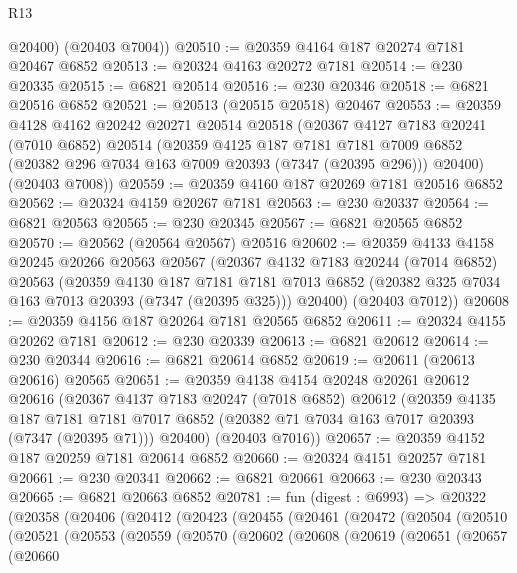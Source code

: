 \begin{lexlean}{R13}
\begin{coremodule}
        @20400)
      (@20403 @7004))
@20510 := @20359 @4164 @187 @20274 @7181 @20467 @6852
@20513 := @20324 @4163 @20272 @7181
@20514 := @230 @20335
@20515 := @6821 @20514
@20516 := @230 @20346
@20518 := @6821 @20516 @6852
@20521 := @20513 (@20515 @20518) @20467
@20553 := @20359
    @4128
    @4162
    @20242
    @20271
    @20514
    @20518
    (@20367
      @4127
      @7183
      @20241
      (@7010 @6852)
      @20514
      (@20359
        @4125
        @187
        @7181
        @7181
        @7009
        @6852
        (@20382 @296 @7034 @163 @7009 @20393 (@7347 (@20395 @296)))
        @20400)
      (@20403 @7008))
@20559 := @20359 @4160 @187 @20269 @7181 @20516 @6852
@20562 := @20324 @4159 @20267 @7181
@20563 := @230 @20337
@20564 := @6821 @20563
@20565 := @230 @20345
@20567 := @6821 @20565 @6852
@20570 := @20562 (@20564 @20567) @20516
@20602 := @20359
    @4133
    @4158
    @20245
    @20266
    @20563
    @20567
    (@20367
      @4132
      @7183
      @20244
      (@7014 @6852)
      @20563
      (@20359
        @4130
        @187
        @7181
        @7181
        @7013
        @6852
        (@20382 @325 @7034 @163 @7013 @20393 (@7347 (@20395 @325)))
        @20400)
      (@20403 @7012))
@20608 := @20359 @4156 @187 @20264 @7181 @20565 @6852
@20611 := @20324 @4155 @20262 @7181
@20612 := @230 @20339
@20613 := @6821 @20612
@20614 := @230 @20344
@20616 := @6821 @20614 @6852
@20619 := @20611 (@20613 @20616) @20565
@20651 := @20359
    @4138
    @4154
    @20248
    @20261
    @20612
    @20616
    (@20367
      @4137
      @7183
      @20247
      (@7018 @6852)
      @20612
      (@20359
        @4135
        @187
        @7181
        @7181
        @7017
        @6852
        (@20382 @71 @7034 @163 @7017 @20393 (@7347 (@20395 @71)))
        @20400)
      (@20403 @7016))
@20657 := @20359 @4152 @187 @20259 @7181 @20614 @6852
@20660 := @20324 @4151 @20257 @7181
@20661 := @230 @20341
@20662 := @6821 @20661
@20663 := @230 @20343
@20665 := @6821 @20663 @6852
@20781 := fun (digest : @6993) =>
  @20322
    (@20358
      (@20406
        (@20412
          (@20423
            (@20455
              (@20461
                (@20472
                  (@20504
                    (@20510
                      (@20521
                        (@20553
                          (@20559
                            (@20570
                              (@20602
                                (@20608
                                  (@20619
                                    (@20651
                                      (@20657
                                        (@20660

\end{coremodule}
\end{lexlean}
